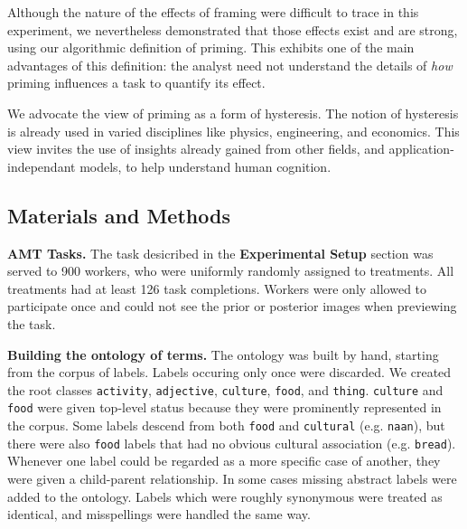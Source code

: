 \documentclass[a4paper]{report}
\begin{document}
Although the nature of the effects of framing were difficult to trace
in this experiment, we nevertheless demonstrated that those effects exist
and are strong, using our algorithmic definition of priming.  This exhibits
one of the main advantages of this definition: the analyst need 
not understand the details of \textit{how} priming influences a task to 
quantify its effect.

We advocate the view of priming as a form of hysteresis.  The notion of 
hysteresis is already used in varied disciplines like physics, engineering,
and economics.  This view invites the use of insights already gained from 
other fields, and application-independant models, to help understand human 
cognition.

\subsection*{Materials and Methods}

\textbf{AMT Tasks.} The task desicribed in the \textbf{Experimental Setup}
section was served to 900 workers, who were uniformly randomly assigned to
treatments.  All treatments had at least 126 task completions.  Workers were
only allowed to participate once and could not see the prior or posterior 
images when previewing the task.

\textbf{Building the ontology of terms.}  The ontology was built by hand, 
starting from the corpus of labels. Labels occuring only once were discarded.  
We created the 
root classes \texttt{activity}, \texttt{adjective}, \texttt{culture}, 
\texttt{food}, and \texttt{thing}. \texttt{culture} and \texttt{food} were 
given top-level status because they were prominently represented in the corpus.
Some labels descend from both \texttt{food} and \texttt{cultural}  
(e.g. \texttt{naan}), but there were also \texttt{food} labels that had no
obvious cultural association (e.g. \texttt{bread}). Whenever one label 
could be regarded as a more specific case of another, they were given a 
child-parent relationship. In some cases missing abstract labels were added to 
the ontology.  Labels which were roughly synonymous were treated as identical,
and misspellings were handled the same way.
\end{document}
